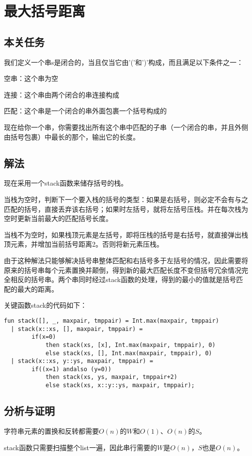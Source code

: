 \documentclass[UTF8,a4paperdui, %
]{ctexart}
\begin{document}
\section{最大括号距离}
\subsection{本关任务}
我们定义一个串s是闭合的，当且仅当它由'('和')'构成，而且满足以下条件之一：

空串：这个串为空

连接：这个串由两个闭合的串连接构成

匹配：这个串是一个闭合的串外面包裹一个括号构成的

现在给你一个串，你需要找出所有这个串中匹配的子串（一个闭合的串，并且外侧由括号包裹）中最长的那个，输出它的长度。
\subsection{解法}
现在采用一个stack函数来储存括号的栈。

当栈为空时，判断下一个要入栈的括号的类型：如果是右括号，则必定不会有与之匹配的括号，直接丢弃该右括号；如果时左括号，就将左括号压栈。并在每次栈为空时更新当前最大的匹配括号长度。

当栈不为空时，如果栈顶元素是左括号，即将压栈的括号是右括号，就直接弹出栈顶元素，并增加当前括号距离2。否则将新元素压栈。

由于这种解法只能够解决括号串整体匹配和右括号多于左括号的情况，因此需要将原来的括号串每个元素置换并颠倒，得到新的最大匹配长度不变但括号冗余情况完全相反的括号串。两个串同时经过stack函数的处理，得到的最小的值就是括号匹配的最大的距离。

关键函数stack的代码如下：
\begin{lstlisting}
fun stack([], _, maxpair, tmppair) = Int.max(maxpair, tmppair)
  | stack(x::xs, [], maxpair, tmppair) = 
        if(x=0) 
            then stack(xs, [x], Int.max(maxpair, tmppair), 0)
            else stack(xs, [], Int.max(maxpair, tmppair), 0)
  | stack(x::xs, y::ys, maxpair, tmppair) = 
        if((x=1) andalso (y=0)) 
            then stack(xs, ys, maxpair, tmppair+2)
            else stack(xs, x::y::ys, maxpair, tmppair);
\end{lstlisting}
\subsection{分析与证明}
字符串元素的置换和反转都需要$O(n)$的$W$和$O(1)$、$O(n)$的$S$。

stack函数只需要扫描整个list一遍，因此串行需要的$W$是$O(n)$，$S$也是$O(n)$。
\end{document}

